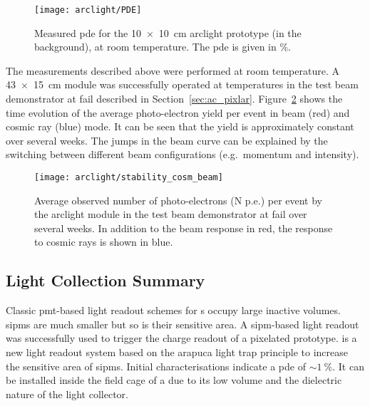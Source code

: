 \begin{figure}[htb]
	\centering
	\texttt{[image: arclight/PDE]}
	\caption[Measured  ]{%
		Measured \acrshort{pde} for the \SI{10 x 10}{\centi\metre} \acrshort{arclight} prototype (in the background), at room temperature.
		The \acrshort{pde} is given in \si{\percent}.
	}
	\label{fig:arclight_pde}
\end{figure}

The measurements described above were performed at room temperature.
A \SI{43 x 15}{\centi\metre} \AL{} module was successfully operated at \lar{} temperatures in the \pixlar{} test beam demonstrator at \gls{fail} described in Section~\ref{sec:ac_pixlar}.
Figure~\ref{fig:arclight_pixlar} shows the time evolution of the average photo-electron yield per event in beam (red) and cosmic ray (blue) mode.
It can be seen that the yield is approximately constant over several weeks.
The jumps in the beam curve can be explained by the switching between different beam configurations (e.g.\ momentum and intensity).


\begin{figure}[htb]
	\centering
	\texttt{[image: arclight/stability\_cosm\_beam]}
	\caption[\pixlar{}  response stability]{%
		Average observed number of photo-electrons (N p.e.) per event by the \acrshort{arclight} module in the \pixlar{} test beam demonstrator at \acrshort{fail} over several weeks.
		In addition to the beam response in red, the response to cosmic rays is shown in blue.
	}
	\label{fig:arclight_pixlar}
\end{figure}


\subsection{Light Collection Summary}
\label{sec:studies_light-col_summary}

Classic \gls{pmt}-based light readout schemes for \lartpc{}s occupy large inactive volumes.
\glspl{sipm} are much smaller but so is their sensitive area.
A \gls{sipm}-based light readout was successfully used to trigger the charge readout of a pixelated \lartpc{} prototype.
\AL{} is a new light readout system based on the \gls{arapuca} light trap principle to increase the sensitive area of \glspl{sipm}.
Initial characterisations indicate a \gls{pde} of $\sim{\SI{1}{\percent}}$.
It can be installed inside the field cage of a \lartpc{} due to its low volume and the dielectric nature of the light collector.